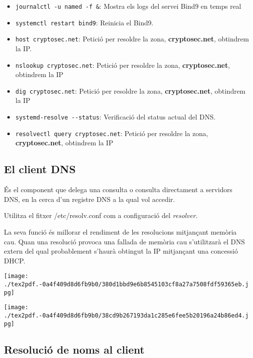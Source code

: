 \documentclass[]{article}
\begin{document}
\begin{itemize}
\item
  \texttt{journalctl\ -u\ named\ -f\ \&}: Mostra els logs del servei
  Bind9 en temps real
\item
  \texttt{systemctl\ restart\ bind9}: Reinicia el Bind9.
\item
  \texttt{host\ cryptosec.net}: Petició per resoldre la zona,
  \textbf{cryptosec.net}, obtindrem la IP.
\item
  \texttt{nslookup\ cryptosec.net}: Petició per resoldre la zona,
  \textbf{cryptosec.net}, obtindrem la IP
\item
  \texttt{dig\ cryptosec.net}: Petició per resoldre la zona,
  \textbf{cryptosec.net}, obtindrem la IP
\item
  \texttt{systemd-resolve\ -\/-status}: Verificació del status actual
  del DNS.
\item
  \texttt{resolvectl\ query\ cryptosec.net}: Petició per resoldre la
  zona, \textbf{cryptosec.net}, obtindrem la IP
\end{itemize}

\hypertarget{el-client-dns}{%
\subsection{\texorpdfstring{\textbf{El client
DNS}}{El client DNS}}\label{el-client-dns}}

És el component que delega una consulta o consulta directament a
servidors DNS, en la cerca d'un registre DNS a la qual vol accedir.

Utilitza el fitxer /etc/resolv.conf com a configuració del
\emph{resolver}.

La seva funció és millorar el rendiment de les resolucions mitjançant
memòria cau. Quan una resolució provoca una fallada de memòria cau
s'utilitzarà el DNS extern del qual probablement s'haurà obtingut la IP
mitjançant una concessió DHCP.

\texttt{[image: ./tex2pdf.-0a4f409d8d6fb9b0/380d1bbd9e6b8545103cf8a27a7508fdf59365eb.jpg]}

\texttt{[image: ./tex2pdf.-0a4f409d8d6fb9b0/38cd9b267193da1c285e6fee5b20196a24b86ed4.jpg]}

\hypertarget{resoluciuxf3-de-noms-al-client}{%
\subsection{\texorpdfstring{\textbf{Resolució de noms al
client}}{Resolució de noms al client}}\label{resoluciuxf3-de-noms-al-client}}
\end{document}
